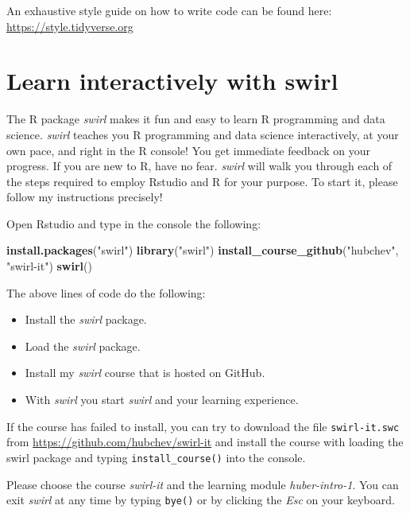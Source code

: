 \documentclass[
  12pt,
  oneside]{book}
\newenvironment{Shaded}{\begin{snugshade}}{\end{snugshade}}
\newcommand{\FunctionTok}[1]{\textcolor[rgb]{0.13,0.29,0.53}{\textbf{#1}}}
\newcommand{\NormalTok}[1]{#1}
\newcommand{\StringTok}[1]{\textcolor[rgb]{0.31,0.60,0.02}{#1}}
\providecommand{\tightlist}{%
  \setlength{\itemsep}{0pt}\setlength{\parskip}{0pt}}
\begin{document}
An exhaustive style guide on how to write code can be found here: \url{https://style.tidyverse.org}

\hypertarget{swirl}{%
\chapter{Learn interactively with swirl}\label{swirl}}

The R package \emph{swirl} makes it fun and easy to learn R programming and data science.
\emph{swirl} teaches you R programming and data science interactively, at your own pace,
and right in the R console! You get immediate feedback on your progress.
If you are new to R, have no fear. \emph{swirl} will walk you through each of the steps
required to employ Rstudio and R for your purpose.
To start it, please follow my instructions precisely!

Open Rstudio and type in the console the following:

\begin{Shaded}
\begin{Highlighting}[]
\FunctionTok{install.packages}\NormalTok{(}\StringTok{"swirl"}\NormalTok{)}
\FunctionTok{library}\NormalTok{(}\StringTok{"swirl"}\NormalTok{)}
\FunctionTok{install\_course\_github}\NormalTok{(}\StringTok{"hubchev"}\NormalTok{, }\StringTok{"swirl{-}it"}\NormalTok{)}
\FunctionTok{swirl}\NormalTok{()}
\end{Highlighting}
\end{Shaded}

The above lines of code do the following:

\begin{itemize}
\tightlist
\item
  Install the \emph{swirl} package.
\item
  Load the \emph{swirl} package.
\item
  Install my \emph{swirl} course that is hosted on GitHub.
\item
  With \emph{swirl} you start \emph{swirl} and your learning experience.
\end{itemize}

If the course has failed to install, you can try to download the file \texttt{swirl-it.swc} from \url{https://github.com/hubchev/swirl-it} and install the course with loading the swirl package and typing \texttt{install\_course()} into the console.

Please choose the course \emph{swirl-it} and the learning module \emph{huber-intro-1}.
You can exit \emph{swirl} at any time by typing \texttt{bye()} or by clicking the \emph{Esc} on your keyboard.
\end{document}
